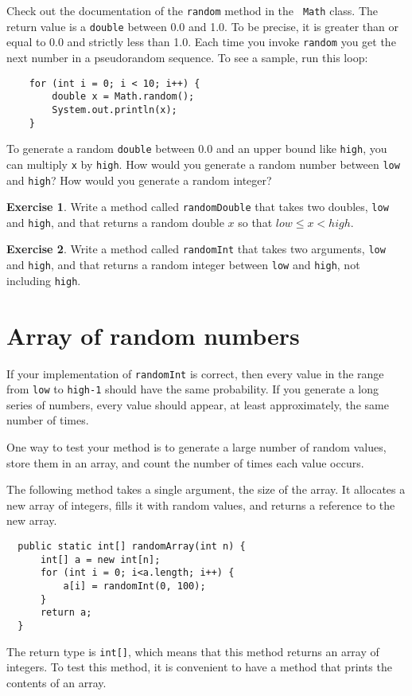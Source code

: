\documentclass[12pt]{book}
\theoremstyle{definition}
\newtheorem{excz}{Exercise}[chapter]
\newenvironment{exercise}{\bigskip\begin{excz}\mbox{}}{\end{excz}}
\begin{document}
Check out the documentation of the {\tt random} method in the {\tt
Math} class.  The return value is a {\tt double} between 0.0 and 1.0.
To be precise, it is greater than or equal to 0.0 and strictly less
than 1.0.  Each time you invoke {\tt random} you get the next
number in a pseudorandom sequence.
To see a sample, run this loop:

\begin{lstlisting}
    for (int i = 0; i < 10; i++) {
        double x = Math.random();
        System.out.println(x);
    }
\end{lstlisting}
%
To generate a random {\tt double} between 0.0 and an upper bound like
{\tt high}, you can multiply {\tt x} by {\tt high}.  How would you
generate a random number between {\tt low} and {\tt high}?  How would
you generate a random integer?


\begin{exercise}
Write a method called {\tt randomDouble} that takes two doubles,
{\tt low} and {\tt high}, and that returns a random double $x$
so that $low \le x < high$.
\end{exercise}


\begin{exercise}
\label{ex.randint}
Write a method called {\tt randomInt} that takes two arguments,
{\tt low} and {\tt high}, and that returns a random integer between
{\tt low} and {\tt high}, not including {\tt high}.
\end{exercise}


\section{Array of random numbers}
\label{randarray}

If your implementation of {\tt randomInt} is correct, then
every value in the range from {\tt low} to {\tt high-1} should
have the same probability.  If you generate a long series
of numbers, every value should appear, at least approximately,
the same number of times.

One way to test your method is to 
generate a large number of random values,
store them in an array, and count the number of times each
value occurs.

The following method takes a single argument, the size of
the array.  It allocates a new array of integers, fills
it with random values, and returns a reference to the new
array.

\begin{lstlisting}
  public static int[] randomArray(int n) {
      int[] a = new int[n];
      for (int i = 0; i<a.length; i++) {
          a[i] = randomInt(0, 100);
      }
      return a;
  }
\end{lstlisting}
%
The return type is {\tt int[]}, which means that
this method returns an array of integers.
To test this method, it is convenient to have a method that
prints the contents of an array.
\end{document}
